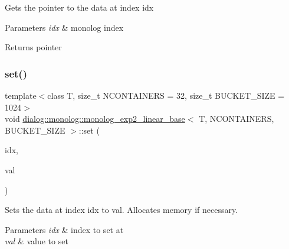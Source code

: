 Gets the pointer to the data at index idx 
\begin{DoxyParams}{Parameters}
{\em idx} & monolog index \\
\hline
\end{DoxyParams}
\begin{DoxyReturn}{Returns}
pointer 
\end{DoxyReturn}
\mbox{\label{classdialog_1_1monolog_1_1monolog__exp2__linear__base_af292efeb7faae83c3f9e24f77a7f1fd8}} 
\subsubsection{\texorpdfstring{set()}{set()}\hspace{0.1cm}{\footnotesize\ttfamily [1/2]}}
{\footnotesize\ttfamily template$<$class T, size\+\_\+t N\+C\+O\+N\+T\+A\+I\+N\+E\+RS = 32, size\+\_\+t B\+U\+C\+K\+E\+T\+\_\+\+S\+I\+ZE = 1024$>$ \\
void \hyperlink{classdialog_1_1monolog_1_1monolog__exp2__linear__base}{dialog\+::monolog\+::monolog\+\_\+exp2\+\_\+linear\+\_\+base}$<$ T, N\+C\+O\+N\+T\+A\+I\+N\+E\+RS, B\+U\+C\+K\+E\+T\+\_\+\+S\+I\+ZE $>$\+::set (\begin{DoxyParamCaption}\item[{size\+\_\+t}]{idx,  }\item[{const T}]{val }\end{DoxyParamCaption})\hspace{0.3cm}{\ttfamily [inline]}}

Sets the data at index idx to val. Allocates memory if necessary. 
\begin{DoxyParams}{Parameters}
{\em idx} & index to set at \\
\hline
{\em val} & value to set \\
\hline
\end{DoxyParams}
\mbox{\label{classdialog_1_1monolog_1_1monolog__exp2__linear__base_a17d6ac9dfede2addd128f99cc7ea72bb}} 
